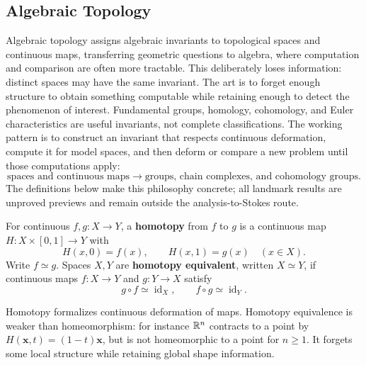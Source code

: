 \subsection*{Algebraic Topology}

\label{sec:algebraic-topology-preview}
Algebraic topology assigns algebraic invariants to topological spaces and
continuous maps, transferring geometric questions to algebra, where
computation and comparison are often more tractable. This deliberately loses information: distinct
spaces may have the same invariant. The art is to forget enough structure
to obtain something computable while retaining enough to detect the
phenomenon of interest. Fundamental groups, homology, cohomology, and Euler
characteristics are useful invariants, not complete classifications.
The working pattern is to construct an invariant that respects continuous
deformation, compute it for model spaces, and then deform or compare a new
problem until those computations apply:
\[
\text{spaces and continuous maps}
\longrightarrow\text{groups, chain complexes, and cohomology groups}.
\]
The definitions below make this philosophy concrete; all landmark results
are unproved previews and remain outside the analysis-to-Stokes route.

\begin{definition}
For continuous $f,g:X\to Y$, a \textbf{homotopy} from $f$ to $g$ is a
continuous map $H:X\times[0,1]\to Y$ with
\[
H(x,0)=f(x),\qquad H(x,1)=g(x)\quad(x\in X).
\]
Write $f\simeq g$. Spaces $X,Y$ are \textbf{homotopy equivalent}, written
$X\simeq Y$, if continuous maps $f:X\to Y$ and $g:Y\to X$ satisfy
\[
g\circ f\simeq\operatorname{id}_X,\qquad f\circ g\simeq\operatorname{id}_Y.
\]
\end{definition}
Homotopy formalizes continuous deformation of maps. Homotopy equivalence
is weaker than homeomorphism: for instance $\mathbb{R}^n$ contracts to a point
by $H(\mathbf{x},t)=(1-t)\mathbf{x}$, but is not homeomorphic to a point for $n\geq1$.
It forgets some local structure while retaining global shape information.

